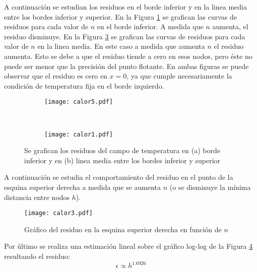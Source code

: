 A continuaci\'on se estudian los residuos en el borde inferior y en la linea media entre los bordes inferior y superior. En la Figura \ref{fig:c5} se grafican las curvas de residuos para cada valor de $n$ en el borde inferior. A medida que $n$ aumenta, el residuo disminuye. En la Figura \ref{fig:c1} se grafican las curvas de residuos para cada valor de $n$ en la linea media. En este caso a medida que aumenta $n$ el residuo aumenta. Esto se debe a que el residuo tiende a cero en esos nodos, pero \'este no puede ser menor que la precisi\'on del punto flotante. En ambas figuras se puede observar que el residuo es cero en $x=0$, ya que cumple necesariamente la condici\'on de temperatura fija en el borde izquierdo. 
\begin{figure}[!ht]
        \begin{subfigure}[ht!]{0.49\textwidth} 
	    \centering
	    \texttt{[image: calor5.pdf]}
	    \caption {}
	    \label{fig:c5}
	    \end{subfigure}
        ~
        \begin{subfigure}[ht!]{0.49\textwidth}
	    \centering
	    \texttt{[image: calor1.pdf]}
	    \caption {}
	    \label{fig:c1}
	    \end{subfigure}
        \caption{Se grafican los residuos del campo de temperatura en (a) borde inferior y en (b) linea media entre los bordes inferior y superior}
\end{figure}
\newpage
A continuaci\'on se estudia el comportamiento del residuo en el punto de la esquina superior derecha a medida que se aumenta $n$ (o se disminuye la m\'inima distancia entre nodos $h$).
 
\begin{figure}[!ht]
\centering
\texttt{[image: calor3.pdf]}
\caption{Gr\'afico del residuo en la esquina superior derecha en funci\'on de $n$}
\label{fig:c3}
\end{figure}

Por \'ultimo se realiza una estimaci\'on lineal sobre el gr\'afico log-log de la Figura \ref{fig:c3} resultando el residuo:
\begin{equation}
\epsilon\propto h^{1.6926}
\end{equation}